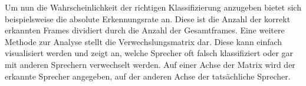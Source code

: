 Um nun die Wahrscheinlichkeit der richtigen Klassifizierung anzugeben bietet sich beispielsweise die absolute Erkennungsrate an. Diese ist die Anzahl der korrekt erkannten Frames dividiert durch die Anzahl der Gesamtframes. Eine weitere Methode zur Analyse stellt die Verwechslungsmatrix dar. Diese kann einfach visualisiert werden und zeigt an, welche Sprecher oft falsch klassifiziert oder gar mit anderen Sprechern verwechselt werden. Auf einer Achse der Matrix wird der erkannte Sprecher angegeben, auf der anderen Achse der tatsächliche Sprecher.


